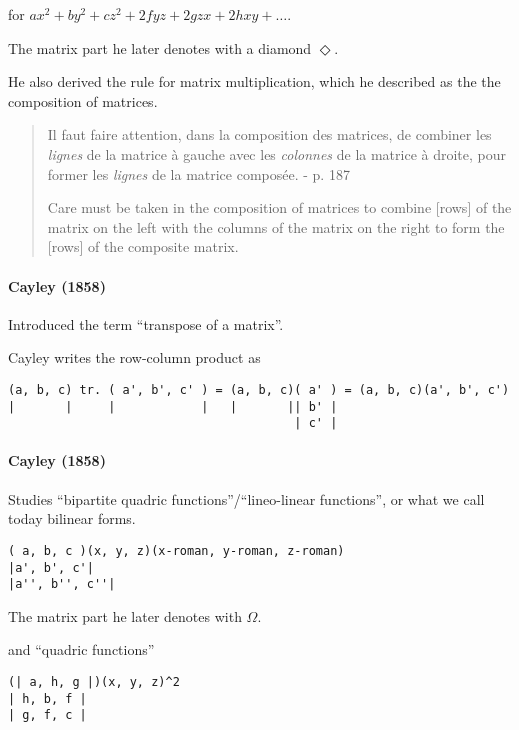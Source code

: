 for $ax^2 + by^2 + cz^2 + 2fyz + 2gzx + 2hxy + \dots$.

The matrix part he later denotes with a diamond $\Diamond$.

He also derived the rule for matrix multiplication, which he described as the
the composition of matrices.
\begin{quote}
Il faut faire attention, dans la composition des matrices, de combiner les \textit{lignes}
de la matrice à gauche avec les \textit{colonnes} de la matrice à droite, pour former les
\textit{lignes} de la matrice composée.
- p. 187

Care must be taken in the composition of matrices to combine [rows]
of the matrix on the left with the columns of the matrix on the right to form the
[rows] of the composite matrix.
\end{quote}

\paragraph{Cayley (1858)~\cite{Cayley1858}}

Introduced the term ``transpose of a matrix''.

Cayley writes the row-column product as

\begin{verbatim}
(a, b, c) tr. ( a', b', c' ) = (a, b, c)( a' ) = (a, b, c)(a', b', c')
|       |     |            |   |       || b' |
                                        | c' |
\end{verbatim}

\paragraph{Cayley (1858)~\cite{Cayley1858b}}

Studies ``bipartite quadric functions''/``lineo-linear functions'', or what we
call today bilinear forms.

\begin{verbatim}
( a, b, c )(x, y, z)(x-roman, y-roman, z-roman)
|a', b', c'|
|a'', b'', c''|
\end{verbatim}

The matrix part he later denotes with $\Omega$.

and ``quadric functions''

\begin{verbatim}
(| a, h, g |)(x, y, z)^2
| h, b, f |
| g, f, c |
\end{verbatim}

